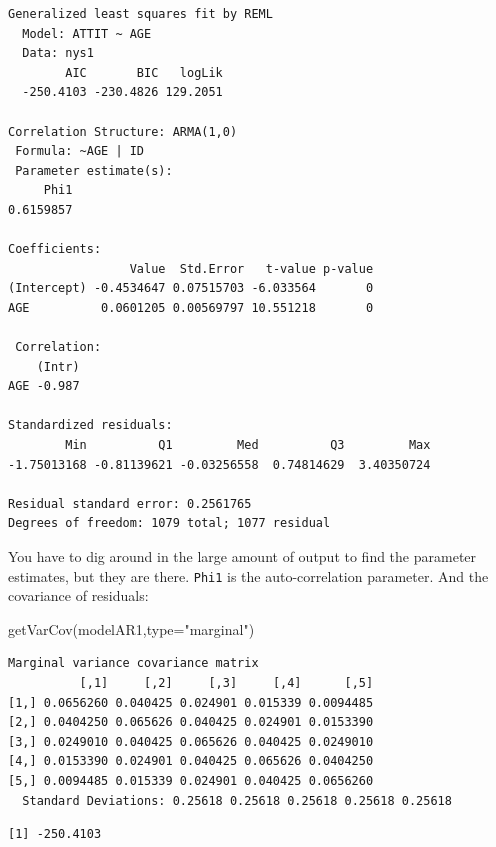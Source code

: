 \documentclass[
  letterpaper,
  DIV=11,
  numbers=noendperiod]{scrreprt}
\newenvironment{Shaded}{}{}
\newcommand{\AttributeTok}[1]{\textcolor[rgb]{0.49,0.56,0.16}{#1}}
\newcommand{\FunctionTok}[1]{\textcolor[rgb]{0.02,0.16,0.49}{#1}}
\newcommand{\NormalTok}[1]{#1}
\newcommand{\SpecialCharTok}[1]{\textcolor[rgb]{0.25,0.44,0.63}{#1}}
\newcommand{\StringTok}[1]{\textcolor[rgb]{0.25,0.44,0.63}{#1}}
\begin{document}
\begin{verbatim}
Generalized least squares fit by REML
  Model: ATTIT ~ AGE 
  Data: nys1 
        AIC       BIC   logLik
  -250.4103 -230.4826 129.2051

Correlation Structure: ARMA(1,0)
 Formula: ~AGE | ID 
 Parameter estimate(s):
     Phi1 
0.6159857 

Coefficients:
                 Value  Std.Error   t-value p-value
(Intercept) -0.4534647 0.07515703 -6.033564       0
AGE          0.0601205 0.00569797 10.551218       0

 Correlation: 
    (Intr)
AGE -0.987

Standardized residuals:
        Min          Q1         Med          Q3         Max 
-1.75013168 -0.81139621 -0.03256558  0.74814629  3.40350724 

Residual standard error: 0.2561765 
Degrees of freedom: 1079 total; 1077 residual
\end{verbatim}

You have to dig around in the large amount of output to find the
parameter estimates, but they are there. \texttt{Phi1} is the
auto-correlation parameter. And the covariance of residuals:

\begin{Shaded}
\begin{Highlighting}[]
\FunctionTok{getVarCov}\NormalTok{(modelAR1,}\AttributeTok{type=}\StringTok{"marginal"}\NormalTok{)}
\end{Highlighting}
\end{Shaded}

\begin{verbatim}
Marginal variance covariance matrix
          [,1]     [,2]     [,3]     [,4]      [,5]
[1,] 0.0656260 0.040425 0.024901 0.015339 0.0094485
[2,] 0.0404250 0.065626 0.040425 0.024901 0.0153390
[3,] 0.0249010 0.040425 0.065626 0.040425 0.0249010
[4,] 0.0153390 0.024901 0.040425 0.065626 0.0404250
[5,] 0.0094485 0.015339 0.024901 0.040425 0.0656260
  Standard Deviations: 0.25618 0.25618 0.25618 0.25618 0.25618 
\end{verbatim}

\begin{Shaded}
\end{Shaded}

\begin{verbatim}
[1] -250.4103
\end{verbatim}
\end{document}
